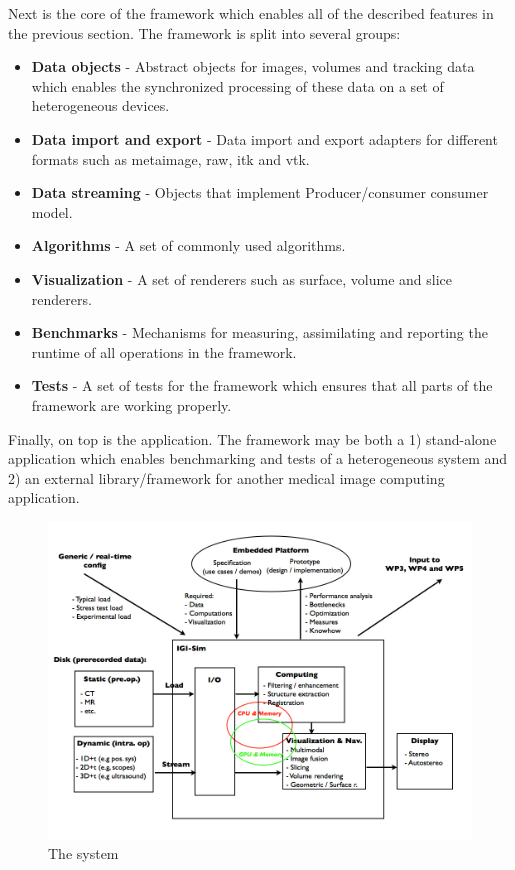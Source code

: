 \documentclass{article}
\begin{document}
Next is the core of the framework which enables all of the described features in the previous section.
The framework is split into several groups:
\begin{itemize}
    \itemsep 1pt
    \item \textbf{Data objects} - Abstract objects for images, volumes and tracking data which enables the synchronized processing of these data on a set of heterogeneous devices.
    \item \textbf{Data import and export} - Data import and export adapters for different formats such as metaimage, raw, itk and vtk.
    \item \textbf{Data streaming} - Objects that implement Producer/consumer consumer model.
    \item \textbf{Algorithms} - A set of commonly used algorithms.
    \item \textbf{Visualization} - A set of renderers such as surface, volume and slice renderers.
    \item \textbf{Benchmarks} - Mechanisms for measuring, assimilating and reporting the runtime of all operations in the framework.
    \item \textbf{Tests} - A set of tests for the framework which ensures that all parts of the framework are working properly.
\end{itemize}

Finally, on top is the application.
The framework may be both a 1) stand-alone application which enables benchmarking and tests of a heterogeneous system and 2) an external library/framework for another medical image computing application.

\begin{figure}[h]
    \includegraphics[width=\textwidth]{system_diagram.png}
    \caption{The system}
\end{figure}
\end{document}
